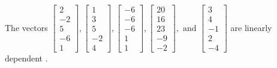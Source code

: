 \begin{exercise}
\begin{exerciseStatement}
  \end{exerciseStatement}
  \begin{exerciseAnswer}
   The vectors \(\left[\begin{array}{r}
2 \\
-2 \\
5 \\
-6 \\
1
\end{array}\right] , \left[\begin{array}{r}
1 \\
3 \\
5 \\
-2 \\
4
\end{array}\right] , \left[\begin{array}{r}
-6 \\
-6 \\
-6 \\
1 \\
1
\end{array}\right] , \left[\begin{array}{r}
20 \\
16 \\
23 \\
-9 \\
-2
\end{array}\right] , \text{ and } \left[\begin{array}{r}
3 \\
4 \\
-1 \\
2 \\
-4
\end{array}\right]\) are 
  	 linearly dependent  .
  


  \end{exerciseAnswer}
\end{exercise}